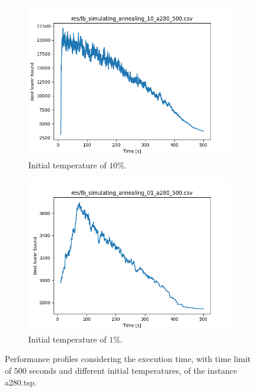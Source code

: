 \begin{figure}[!h]
\begin{subfigure}{.5\columnwidth}
		\centering
		\includegraphics[width=\columnwidth]{../res/lb_simulating_annealing_10_a280_500.png}
		\caption{Initial temperature of $10$\%.}
		\label{fig:sim_ann_10}
	\end{subfigure}
	\begin{subfigure}{.5\columnwidth}
		\centering
		\includegraphics[width=\columnwidth]{../res/lb_simulating_annealing_01_a280_500.png}
		\caption{Initial temperature of $1$\%.}
		\label{fig:sim_ann_1}
	\end{subfigure}
	\caption{Performance profiles considering the execution time, with time limit of $500$ seconds and different initial temperatures, of the instance a280.tsp.}
	\label{fig:sim_ann_temperature}
\end{figure}
